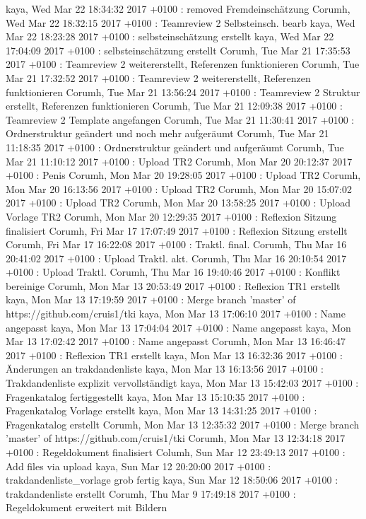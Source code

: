 kaya, Wed Mar 22 18:34:32 2017 +0100 : removed Fremdeinschätzung
Corumh, Wed Mar 22 18:32:15 2017 +0100 : Teamreview 2 Selbsteinsch. bearb
kaya, Wed Mar 22 18:23:28 2017 +0100 : selbsteinschätzung erstellt
kaya, Wed Mar 22 17:04:09 2017 +0100 : selbsteinschätzung erstellt
Corumh, Tue Mar 21 17:35:53 2017 +0100 : Teamreview 2 weitererstellt, Referenzen funktionieren
Corumh, Tue Mar 21 17:32:52 2017 +0100 : Teamreview 2 weitererstellt, Referenzen funktionieren
Corumh, Tue Mar 21 13:56:24 2017 +0100 : Teamreview 2 Struktur erstellt, Referenzen funktionieren
Corumh, Tue Mar 21 12:09:38 2017 +0100 : Teamreview 2 Template angefangen
Corumh, Tue Mar 21 11:30:41 2017 +0100 : Ordnerstruktur geändert und noch mehr aufgeräumt
Corumh, Tue Mar 21 11:18:35 2017 +0100 : Ordnerstruktur geändert und aufgeräumt
Corumh, Tue Mar 21 11:10:12 2017 +0100 : Upload TR2
Corumh, Mon Mar 20 20:12:37 2017 +0100 : Penis
Corumh, Mon Mar 20 19:28:05 2017 +0100 : Upload TR2
Corumh, Mon Mar 20 16:13:56 2017 +0100 : Upload TR2
Corumh, Mon Mar 20 15:07:02 2017 +0100 : Upload TR2
Corumh, Mon Mar 20 13:58:25 2017 +0100 : Upload Vorlage TR2
Corumh, Mon Mar 20 12:29:35 2017 +0100 : Reflexion Sitzung finalisiert
Corumh, Fri Mar 17 17:07:49 2017 +0100 : Reflexion Sitzung erstellt
Corumh, Fri Mar 17 16:22:08 2017 +0100 : Traktl. final.
Corumh, Thu Mar 16 20:41:02 2017 +0100 : Upload Traktl. akt.
Corumh, Thu Mar 16 20:10:54 2017 +0100 : Upload Traktl.
Corumh, Thu Mar 16 19:40:46 2017 +0100 : Konflikt bereinige
Corumh, Mon Mar 13 20:53:49 2017 +0100 : Reflexion TR1 erstellt
kaya, Mon Mar 13 17:19:59 2017 +0100 : Merge branch 'master' of https://github.com/cruis1/tki
kaya, Mon Mar 13 17:06:10 2017 +0100 : Name angepasst
kaya, Mon Mar 13 17:04:04 2017 +0100 : Name angepasst
kaya, Mon Mar 13 17:02:42 2017 +0100 : Name angepasst
Corumh, Mon Mar 13 16:46:47 2017 +0100 : Reflexion TR1 erstellt
kaya, Mon Mar 13 16:32:36 2017 +0100 : Änderungen an trakdandenliste
kaya, Mon Mar 13 16:13:56 2017 +0100 : Trakdandenliste explizit vervollständigt
kaya, Mon Mar 13 15:42:03 2017 +0100 : Fragenkatalog fertiggestellt
kaya, Mon Mar 13 15:10:35 2017 +0100 : Fragenkatalog Vorlage erstellt
kaya, Mon Mar 13 14:31:25 2017 +0100 : Fragenkatalog erstellt
Corumh, Mon Mar 13 12:35:32 2017 +0100 : Merge branch 'master' of https://github.com/cruis1/tki
Corumh, Mon Mar 13 12:34:18 2017 +0100 : Regeldokument finalisiert
Columh, Sun Mar 12 23:49:13 2017 +0100 : Add files via upload
kaya, Sun Mar 12 20:20:00 2017 +0100 : trakdandenliste_vorlage grob fertig
kaya, Sun Mar 12 18:50:06 2017 +0100 : trakdandenliste erstellt
Corumh, Thu Mar 9 17:49:18 2017 +0100 : Regeldokument erweitert mit Bildern

